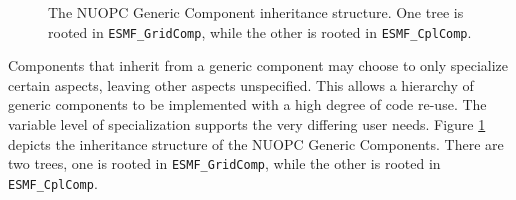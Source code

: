 \begin{figure}
\begin{center}
\end{center}
\caption{The NUOPC Generic Component inheritance structure. One tree is rooted in {\tt ESMF\_GridComp}, while the other is rooted in {\tt ESMF\_CplComp}.}
\label{fig:NUOPCGenericComp}
\end{figure}

Components that inherit from a generic component may choose to only specialize certain aspects, leaving other aspects unspecified. This allows a hierarchy of generic components to be implemented with a high degree of code re-use. The variable level of specialization supports the very differing user needs. Figure \ref{fig:NUOPCGenericComp} depicts the inheritance structure of the NUOPC Generic Components. There are two trees, one is rooted in {\tt ESMF\_GridComp}, while the other is rooted in {\tt ESMF\_CplComp}.


